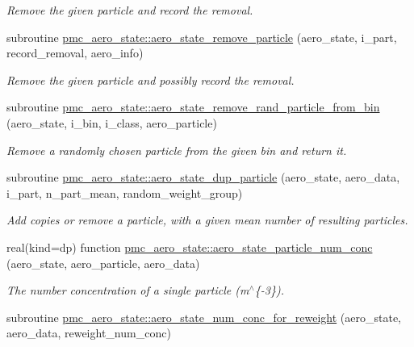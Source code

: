 \begin{DoxyCompactItemize}
\begin{DoxyCompactList}\small\item\em Remove the given particle and record the removal. \end{DoxyCompactList}\item 
subroutine \mbox{\hyperlink{namespacepmc__aero__state_ac19bda6a4cd1c2a3ea9f6cadf9dc9bb6}{pmc\+\_\+aero\+\_\+state\+::aero\+\_\+state\+\_\+remove\+\_\+particle}} (aero\+\_\+state, i\+\_\+part, record\+\_\+removal, aero\+\_\+info)
\begin{DoxyCompactList}\small\item\em Remove the given particle and possibly record the removal. \end{DoxyCompactList}\item 
subroutine \mbox{\hyperlink{namespacepmc__aero__state_aabf1b375475462cc54740039ad556a83}{pmc\+\_\+aero\+\_\+state\+::aero\+\_\+state\+\_\+remove\+\_\+rand\+\_\+particle\+\_\+from\+\_\+bin}} (aero\+\_\+state, i\+\_\+bin, i\+\_\+class, aero\+\_\+particle)
\begin{DoxyCompactList}\small\item\em Remove a randomly chosen particle from the given bin and return it. \end{DoxyCompactList}\item 
subroutine \mbox{\hyperlink{namespacepmc__aero__state_a4f965b4eaeeec1b01e2299016a3680cf}{pmc\+\_\+aero\+\_\+state\+::aero\+\_\+state\+\_\+dup\+\_\+particle}} (aero\+\_\+state, aero\+\_\+data, i\+\_\+part, n\+\_\+part\+\_\+mean, random\+\_\+weight\+\_\+group)
\begin{DoxyCompactList}\small\item\em Add copies or remove a particle, with a given mean number of resulting particles. \end{DoxyCompactList}\item 
real(kind=dp) function \mbox{\hyperlink{namespacepmc__aero__state_a6e14396858e4011e0b36ebc5cd653bc2}{pmc\+\_\+aero\+\_\+state\+::aero\+\_\+state\+\_\+particle\+\_\+num\+\_\+conc}} (aero\+\_\+state, aero\+\_\+particle, aero\+\_\+data)
\begin{DoxyCompactList}\small\item\em The number concentration of a single particle (m$^\wedge$\{-\/3\}). \end{DoxyCompactList}\item 
subroutine \mbox{\hyperlink{namespacepmc__aero__state_a08e7e95e0c08167046e3238693096dee}{pmc\+\_\+aero\+\_\+state\+::aero\+\_\+state\+\_\+num\+\_\+conc\+\_\+for\+\_\+reweight}} (aero\+\_\+state, aero\+\_\+data, reweight\+\_\+num\+\_\+conc)

\end{DoxyCompactItemize}
